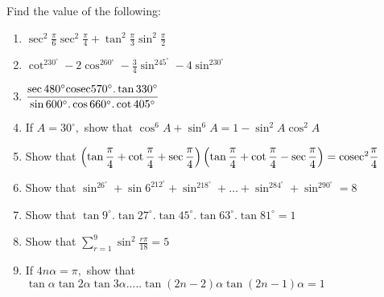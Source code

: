 Find the value of the following:
\begin{enumerate}[resume]
\item $\sec^2\frac{\pi}{6}\sec^2\frac{\pi}{4} + \tan^2\frac{\pi}{3}\sin^2\frac{\pi}{2}$
\item $\cot^230^\circ - 2\cos^260^\circ - \frac{3}{4}\sin^245^\circ - 4\sin^230^\circ$
\item $\frac{\sec 480^\circ{\rm cosec}570^\circ.\tan 330^\circ}{\sin 600^\circ.\cos 660^\circ.\cot 405^\circ}$
\item If $A = 30^\circ,$ show that $\cos^6A + \sin^6A = 1 - \sin^2A\cos^2A$
\item Show that $\left(\tan \frac{\pi}{4} + \cot \frac{\pi}{4} + \sec\frac{\pi}{4}\right)\left(\tan \frac{\pi}{4} + \cot
    \frac{\pi}{4} - \sec \frac{\pi}{4}\right) = {\rm cosec}^2 \frac{\pi}{4}$
\item Show that $\sin^26^\circ + \sin6^212^\circ + \sin^218^\circ + \ldots + \sin^284^\circ + \sin^290^\circ = 8$
\item Show that $\tan 9^\circ.\tan 27^\circ.\tan 45^\circ.\tan 63^\circ.\tan 81^\circ = 1$
\item Show that $\sum_{r = 1}^9 \sin^2\frac{r\pi}{18} = 5$
\item If $4n\alpha = \pi,$ show that $\tan\alpha\tan2\alpha\tan3\alpha. \ldots .\tan(2n - 2)\alpha\tan(2n - 1)\alpha = 1$
\end{enumerate}
